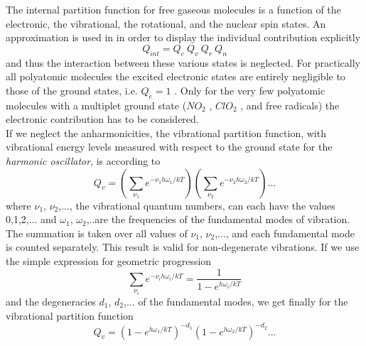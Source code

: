 The internal partition function for free gaseous molecules is a
function of the electronic, the vibrational, the rotational, and the
nuclear spin states. An approximation is used in
\citet{gordyandcook:70} in order to display the individual
contribution explicitly
\begin{equation}\label{int_partition}
 Q_{int}=Q_e~Q_v~Q_r~Q_n
\end{equation}
and thus the interaction between these various states is neglected.
For practically all polyatomic molecules the excited electronic states
are entirely negligible to those of the ground states, i.e. $Q_e=1$ .
Only for the very few polyatomic molecules with a multiplet ground
state ($NO_2$ , $ClO_2$ , and free radicals) the
electronic contribution has to be considered.\\
If we neglect the anharmonicities, the vibrational partition function,
with vibrational energy levels measured with respect to the ground
state for the {\it harmonic oscillator}, is according to \citet{herzberg:45}
\begin{equation}\label{vib_partition}
 Q_v=\left(\sum_{\nu_1}e^{-\nu_1 h\omega_1/kT}\right)\left(\sum_{\nu_2}e^{-\nu_2 h\omega_2/kT}\right)...
\end{equation}
where $\nu_1$, $\nu_2$,..., the vibrational quantum numbers, can each
have the values 0,1,2,... and $\omega_1$, $\omega_2$,..are the
frequencies of the fundamental modes of vibration. The summation is
taken over all values of $\nu_1$, $\nu_2$,..., and each fundamental
mode is counted separately. This result is valid for non-degenerate
vibrations. If we use the simple expression for geometric progression
\begin{equation}\label{geom_progression}
 \sum_{\nu_i}e^{-\nu_i h\omega_i/kT}=\frac{1}{1-e^{h\omega_i/kT}}
\end{equation}
and the degeneracies $d_1$, $d_2$,... of the fundamental modes, we get
finally for the vibrational partition function
\begin{equation}\label{vib_partition_fin}
Q_v=\left(1-e^{h\omega_1/kT}\right)^{-d_1}\left(1-e^{h\omega_2/kT}\right)^{-d_2}...
\end{equation}


